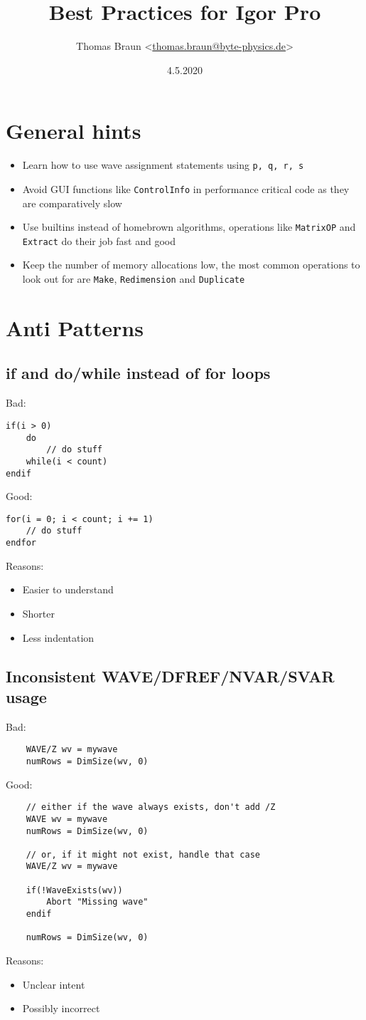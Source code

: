 \documentclass{scrartcl}
\date{4.5.2020}
\author{Thomas Braun <\url{thomas.braun@byte-physics.de}>}
\title{Best Practices for Igor Pro}
\begin{document}
%
\maketitle
%
\section{General hints}
\begin{itemize}
	\item Learn how to use wave assignment statements using \texttt{p, q, r, s}
	\item Avoid GUI functions like \texttt{ControlInfo} in performance critical code as they are comparatively slow
	\item Use builtins instead of homebrown algorithms, operations like \texttt{MatrixOP} and \texttt{Extract} do their job fast and good
	\item Keep the number of memory allocations low, the most common operations to look out for are \texttt{Make}, \texttt{Redimension} and \texttt{Duplicate}
\end{itemize}
%
\section{Anti Patterns}
%
\subsection{if and do/while instead of for loops}
Bad:
\begin{verbatim}
if(i > 0)
	do
		// do stuff
	while(i < count)
endif
\end{verbatim}
Good:
\begin{verbatim}
for(i = 0; i < count; i += 1)
	// do stuff
endfor
\end{verbatim}
Reasons:
\begin{itemize}
	\item Easier to understand
	\item Shorter
	\item Less indentation
\end{itemize}
%
\subsection{Inconsistent WAVE/DFREF/NVAR/SVAR usage}
Bad:
\begin{verbatim}
	WAVE/Z wv = mywave
	numRows = DimSize(wv, 0)
\end{verbatim}
Good:
\begin{verbatim}
	// either if the wave always exists, don't add /Z
	WAVE wv = mywave
	numRows = DimSize(wv, 0)

	// or, if it might not exist, handle that case
	WAVE/Z wv = mywave

	if(!WaveExists(wv))
		Abort "Missing wave"
	endif

	numRows = DimSize(wv, 0)
\end{verbatim}
Reasons:
\begin{itemize}
	\item Unclear intent
	\item Possibly incorrect
\end{itemize}
%
\end{document}

